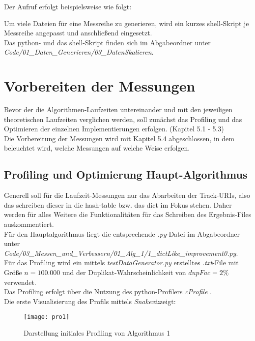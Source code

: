 \documentclass[
10pt, %
a4paper, %
oneside, %
headinclude,footinclude, %
BCOR5mm, %
]{scrartcl}
\begin{document}
Der Aufruf erfolgt beispielsweise wie folgt:


Um viele Dateien für eine Messreihe zu generieren, wird ein kurzes shell-Skript je Messreihe angepasst und anschließend eingesetzt.\\

Das python- und das shell-Skript finden sich im Abgabeordner unter\\ \textit{Code/01\_Daten\_Generieren/03\_DatenSkalieren}.

\section{Vorbereiten der Messungen}
Bevor der die Algorithmen-Laufzeiten untereinander und mit den jeweiligen theoretischen Laufzeiten verglichen werden, soll zunächst das Profiling und das Optimieren der einzelnen Implementierungen erfolgen. (Kapitel 5.1 - 5.3)\\
Die Vorbereitung der Messungen wird mit Kapitel 5.4 abgeschlossen, in dem beleuchtet wird, welche Messungen auf welche Weise erfolgen.

\subsection{Profiling und Optimierung Haupt-Algorithmus}
Generell soll für die Laufzeit-Messungen nur das Abarbeiten der Track-URIs, also das schreiben dieser in die hash-table bzw. das dict im Fokus stehen. Daher werden für alles Weitere die Funktionalitäten für das Schreiben des Ergebnis-Files auskommentiert.\\
Für den Hauptalgorithmus liegt die entsprechende \textit{.py}-Datei im Abgabeordner unter \textit{Code/03\_Messen\_und\_Verbessern/01\_Alg\_1/1\_dictLike\_improvement0.py}.\\

Für das Profiling wird ein mittels \textit{testDataGenerator.py} erstelltes \textit{.txt}-File mit Größe \(n=100.000\) und der Duplikat-Wahrscheinlichkeit von \(dupFac = 2\%\) verwendet.\\
Das Profiling erfolgt über die Nutzung des python-Profilers \textit{cProfile} \cite{CPROF}.\\

Die erste Visualisierung des Profils mittels \textit{Snakeviz}\cite{SNAKE}zeigt:\\
\begin{figure}[h!]
	\centering 
	\texttt{[image: pro1]} 
	\caption[Darstellung initiales Profiling Alg. 1]{Darstellung initiales Profiling von Algorithmus 1}
\end{figure}\
\end{document}
